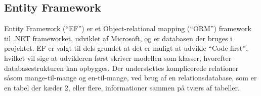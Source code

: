 \subsection{Entity Framework}
Entity Framework (``EF'') er et Object-relational mapping (``ORM'') framework til .NET frameworket, udviklet af Microsoft, og er databasen der bruges i projektet. \citep{EF} 
EF er valgt til dels grundet at det er muligt at udvikle ``Code-first'', hvilket vil sige at udvikleren først skriver modellen som klasser, hvorefter databasestrukturen kan opbygges. 
Der understøttes komplicerede relationer såsom mange-til-mange og en-til-mange, ved brug af en relationsdatabase, som er en tabel der kæder 2, eller flere, informationer sammen på tværs af tabeller.
